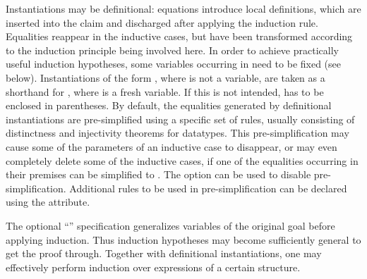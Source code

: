 \begin{isabellebody}
\begin{isamarkuptext}
\begin{description}
  Instantiations may be definitional: equations 
  introduce local definitions, which are inserted into the claim and
  discharged after applying the induction rule.  Equalities reappear
  in the inductive cases, but have been transformed according to the
  induction principle being involved here.  In order to achieve
  practically useful induction hypotheses, some variables occurring in
   need to be fixed (see below).  Instantiations of the form
  , where  is not a variable, are taken as a
  shorthand for \mbox{}, where  is a fresh
  variable. If this is not intended,  has to be enclosed in
  parentheses.  By default, the equalities generated by definitional
  instantiations are pre-simplified using a specific set of rules,
  usually consisting of distinctness and injectivity theorems for
  datatypes. This pre-simplification may cause some of the parameters
  of an inductive case to disappear, or may even completely delete
  some of the inductive cases, if one of the equalities occurring in
  their premises can be simplified to .  The  option can be used to disable pre-simplification.
  Additional rules to be used in pre-simplification can be declared
  using the \hypertarget{attribute.induct-simp}{\hyperlink{attribute.induct-simp}{\mbox{}}} attribute.

  The optional ``''
  specification generalizes variables  of the original goal before applying induction.  Thus
  induction hypotheses may become sufficiently general to get the
  proof through.  Together with definitional instantiations, one may
  effectively perform induction over expressions of a certain
  structure.
  

\end{description}
\end{isamarkuptext}
\end{isabellebody}
